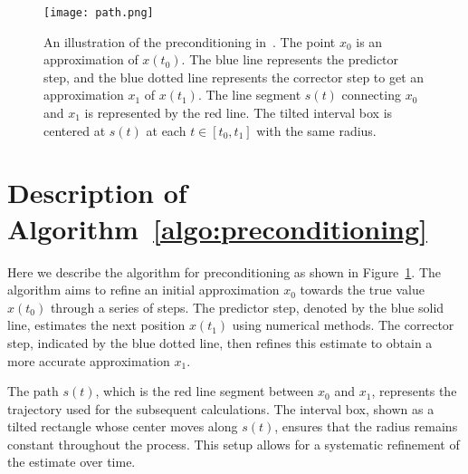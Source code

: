 \documentclass[12pt]{article}
\begin{document}
\begin{figure}[h]
    \centering
    \texttt{[image: path.png]} %
    \caption{An illustration of the preconditioning in~. The point \( x_0 \) is an approximation of \( x(t_0) \). The blue line represents the predictor step, and the blue dotted line represents the corrector step to get an approximation \( x_1 \) of \( x(t_1) \). The line segment \( s(t) \) connecting \( x_0 \) and \( x_1 \) is represented by the red line. The tilted interval box is centered at \( s(t) \) at each \( t \in [t_0, t_1] \) with the same radius.}
    \label{fig:path}
\end{figure}

\section{Description of Algorithm~\ref{algo:preconditioning}}

Here we describe the algorithm for preconditioning as shown in Figure~\ref{fig:path}. The algorithm aims to refine an initial approximation \( x_0 \) towards the true value \( x(t_0) \) through a series of steps. The predictor step, denoted by the blue solid line, estimates the next position \( x(t_1) \) using numerical methods. The corrector step, indicated by the blue dotted line, then refines this estimate to obtain a more accurate approximation \( x_1 \).

The path \( s(t) \), which is the red line segment between \( x_0 \) and \( x_1 \), represents the trajectory used for the subsequent calculations. The interval box, shown as a tilted rectangle whose center moves along \( s(t) \), ensures that the radius remains constant throughout the process. This setup allows for a systematic refinement of the estimate over time.
\end{document}
